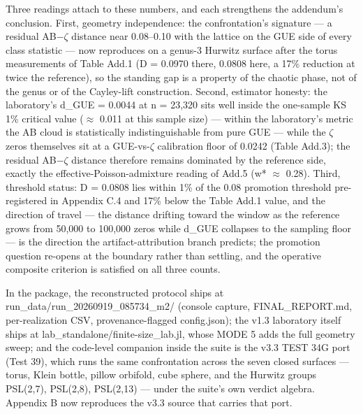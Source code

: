 \documentclass[10pt]{article}
\begin{document}
Three readings attach to these numbers, and each strengthens the addendum’s conclusion. First, geometry independence: the confrontation’s signature --- a residual AB$-$$\zeta$ distance near 0.08--0.10 with the lattice on the GUE side of every class statistic --- now reproduces on a genus-3 Hurwitz surface after the torus measurements of Table Add.1 (D = 0.0970 there, 0.0808 here, a 17\% reduction at twice the reference), so the standing gap is a property of the chaotic phase, not of the genus or of the Cayley-lift construction. Second, estimator honesty: the laboratory’s d\_GUE = 0.0044 at n = 23,320 sits well inside the one-sample KS 1\% critical value ($\approx$ 0.011 at this sample size) --- within the laboratory’s metric the AB cloud is statistically indistinguishable from pure GUE --- while the $\zeta$ zeros themselves sit at a GUE-vs-$\zeta$ calibration floor of 0.0242 (Table Add.3); the residual AB$-$$\zeta$ distance therefore remains dominated by the reference side, exactly the effective-Poisson-admixture reading of Add.5 (w* $\approx$ 0.28). Third, threshold status: D = 0.0808 lies within 1\% of the 0.08 promotion threshold pre-registered in Appendix C.4 and 17\% below the Table Add.1 value, and the direction of travel --- the distance drifting toward the window as the reference grows from 50,000 to 100,000 zeros while d\_GUE collapses to the sampling floor --- is the direction the artifact-attribution branch predicts; the promotion question re-opens at the boundary rather than settling, and the operative composite criterion is satisfied on all three counts.


In the package, the reconstructed protocol ships at run\_data/run\_20260919\_085734\_m2/ (console capture, FINAL\_REPORT.md, per-realization CSV, provenance-flagged config.json); the v1.3 laboratory itself ships at lab\_standalone/finite-size\_lab.jl, whose MODE 5 adds the full geometry sweep; and the code-level companion inside the suite is the v3.3 TEST 34G port (Test 39), which runs the same confrontation across the seven closed surfaces --- torus, Klein bottle, pillow orbifold, cube sphere, and the Hurwitz groups PSL(2,7), PSL(2,8), PSL(2,13) --- under the suite’s own verdict algebra. Appendix B now reproduces the v3.3 source that carries that port.
\end{document}
